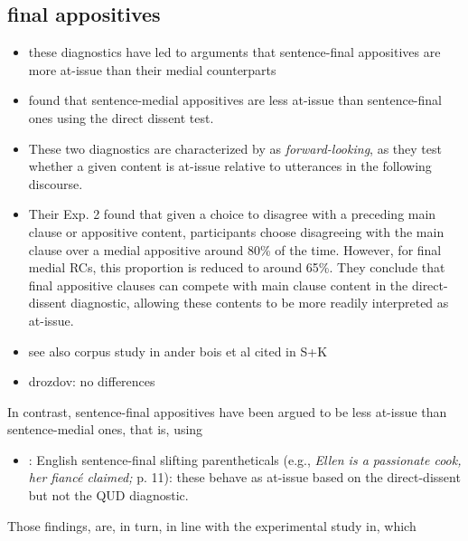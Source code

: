 \documentclass[times,linguex,xcolor]{glossa}
\begin{document}
    

  \subsection{final appositives}
    \begin{itemize}
      \item these diagnostics have led to arguments that sentence-final appositives are more at-issue than their medial counterparts

      \item found that sentence-medial appositives are less at-issue than sentence-final ones using the direct dissent test.

      \item These two diagnostics are characterized by \citealt{koev_notions_2018} as \emph{forward-looking}, as they test whether a given content is at-issue relative to utterances in the following discourse.


      \item \citealt{syrett_experimental_2015} Their Exp. 2 found that given a choice to disagree with a preceding main clause or appositive content, participants choose disagreeing with the main clause over a medial appositive around 80\% of the time. However, for final medial RCs, this proportion is reduced to around 65\%. They conclude that final appositive clauses can compete with main clause content in the direct-dissent diagnostic, allowing these contents to be more readily interpreted as at-issue.

      \item see also corpus study in ander bois et al cited in S+K

      \item drozdov: no differences

    \end{itemize}
  
    In contrast, sentence-final appositives have been argued to be less at-issue than sentence-medial ones, that is, using 

    \begin{itemize}
      \item \citealt{koev_notions_2018}: English sentence-final slifting parentheticals (e.g., \emph{Ellen is a passionate cook, her fiancé claimed;} p. 11): these behave as at-issue based on the direct-dissent but not the QUD diagnostic.
    \end{itemize}


  Those findings, are, in turn, in line with the experimental study in, which 
\end{document}
